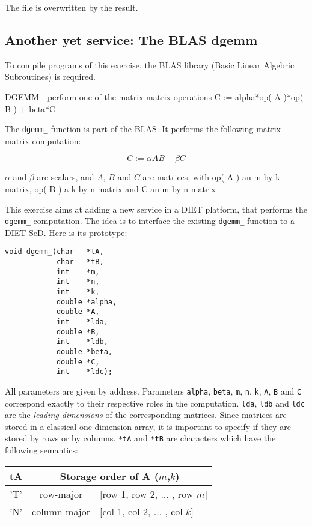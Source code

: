 \documentclass[11pt,a4paper]{article}
\begin{document}
The file is overwritten by the result.

\subsection{Another yet service: The BLAS dgemm}

To compile programs of this exercise, the BLAS library (Basic Linear
Algebric Subroutines) is required.

DGEMM  -  perform  one of the matrix-matrix operations   C :=
       alpha*op( A )*op( B ) + beta*C

The \texttt{dgemm\_} function is part of the BLAS.  It performs the
following matrix-matrix computation:

$$ C := \alpha A B + \beta C $$

$\alpha$ and $\beta$ are scalars, and $A$, $B$ and $C$ are matrices,
with op( A ) an m by k matrix, op( B ) a k by n matrix and C an m by n
matrix

This exercise aims at adding a new service in a DIET platform, that
performs the \texttt{dgemm\_} computation. The idea is to interface
the existing \texttt{dgemm\_} function to a DIET SeD. Here is its
prototype:

\begin{verbatim}
void dgemm_(char   *tA,
            char   *tB,
            int    *m,
            int    *n,
            int    *k,
            double *alpha,
            double *A,
            int    *lda,
            double *B,
            int    *ldb,
            double *beta,
            double *C,
            int    *ldc);
\end{verbatim}

All parameters are given by address. Parameters \texttt{alpha}, \texttt{beta},
\texttt{m}, \texttt{n}, \texttt{k}, \texttt{A}, \texttt{B} and \texttt{C}
correspond exactly to their respective roles in the computation. \texttt{lda},
\texttt{ldb} and \texttt{ldc} are the \emph{leading dimensions} of the
corresponding matrices. Since matrices are stored in a classical one-dimension
array, it is important to specify if they are stored by rows or by columns.
\texttt{*tA} and \texttt{*tB} are characters which have the following semantics:
\begin{center}
\begin{tabular}{|c|c|l|}\hline
tA  &  \multicolumn{2}{c|}{Storage order of A ($m$,$k$)}\\\hline
'T' &  row-major    & [row 1, row 2, ... , row $m$]\\
'N' &  column-major & [col 1, col 2, ... , col $k$] \\\hline
\end{tabular}
\end{center}
\end{document}
